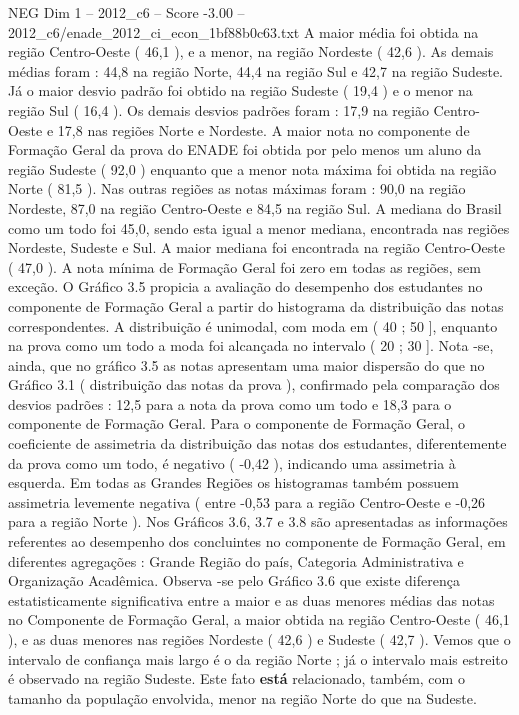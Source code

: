 \begin{textsample}{NEG Dim 1 – 2012\_c6 – Score -3.00 – 2012\_c6/enade\_2012\_ci\_econ\_1bf88b0c63.txt}
A maior média foi obtida na região Centro-Oeste ( 46,1 ), e a menor, na região Nordeste ( 42,6 ).
As demais médias foram : 44,8 na região Norte, 44,4 na região Sul e 42,7 na região Sudeste.
Já o maior desvio padrão foi obtido na região Sudeste ( 19,4 ) e o menor na região Sul ( 16,4 ).
Os demais desvios padrões foram : 17,9 na região Centro-Oeste e 17,8 nas regiões Norte e Nordeste.
A maior nota no componente de Formação Geral da prova do ENADE foi obtida por pelo menos um aluno da região Sudeste ( 92,0 ) enquanto que a menor nota máxima foi obtida na região Norte ( 81,5 ).
Nas outras regiões as notas máximas foram : 90,0 na região Nordeste, 87,0 na região Centro-Oeste e 84,5 na região Sul.
A mediana do Brasil como um todo foi 45,0, sendo esta igual a menor mediana, encontrada nas regiões Nordeste, Sudeste e Sul.
A maior mediana foi encontrada na região Centro-Oeste ( 47,0 ).
A nota mínima de Formação Geral foi zero em todas as regiões, sem exceção.
O Gráfico 3.5 propicia a avaliação do desempenho dos estudantes no componente de Formação Geral a partir do histograma da distribuição das notas correspondentes.
A distribuição é unimodal, com moda em ( 40 ; 50 ], enquanto na prova como um todo a moda foi alcançada no intervalo ( 20 ; 30 ].
Nota -se, ainda, que no gráfico 3.5 as notas apresentam uma maior dispersão do que no Gráfico 3.1 ( distribuição das notas da prova ), confirmado pela comparação dos desvios padrões : 12,5 para a nota da prova como um todo e 18,3 para o componente de Formação Geral.
Para o componente de Formação Geral, o coeficiente de assimetria da distribuição das notas dos estudantes, diferentemente da prova como um todo, é negativo ( -0,42 ), indicando uma assimetria à esquerda.
Em todas as Grandes Regiões os histogramas também possuem assimetria levemente negativa ( entre -0,53 para a região Centro-Oeste e -0,26 para a região Norte ).
Nos Gráficos 3.6, 3.7 e 3.8 são apresentadas as informações referentes ao desempenho dos concluintes no componente de Formação Geral, em diferentes agregações : Grande Região do país, Categoria Administrativa e Organização Acadêmica.
Observa -se pelo Gráfico 3.6 que existe diferença estatisticamente significativa entre a maior e as duas menores médias das notas no Componente de Formação Geral, a maior obtida na região Centro-Oeste ( 46,1 ), e as duas menores nas regiões Nordeste ( 42,6 ) e Sudeste ( 42,7 ).
Vemos que o intervalo de confiança mais largo é o da região Norte ; já o intervalo mais estreito é observado na região Sudeste.
Este fato \textbf{está} relacionado, também, com o tamanho da população envolvida, menor na região Norte do que na Sudeste.

\end{textsample}
